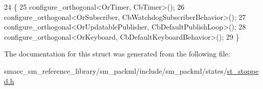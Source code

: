 \begin{DoxyCode}
24     \{
25         configure\_orthogonal<OrTimer, CbTimer>();   
26         configure\_orthogonal<OrSubscriber, CbWatchdogSubscriberBehavior>();
27         configure\_orthogonal<OrUpdatablePublisher, CbDefaultPublishLoop>();
28         configure\_orthogonal<OrKeyboard, CbDefaultKeyboardBehavior>();
29     \}
\end{DoxyCode}


The documentation for this struct was generated from the following file\+:\begin{DoxyCompactItemize}
\item 
smacc\+\_\+sm\+\_\+reference\+\_\+library/sm\+\_\+packml/include/sm\+\_\+packml/states/\hyperlink{st__stopped_8h}{st\+\_\+stopped.\+h}\end{DoxyCompactItemize}
